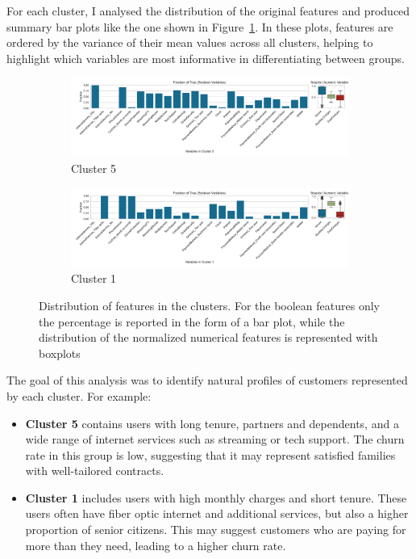 \documentclass[a4paper,11pt]{article}
\begin{document}
For each cluster, I analysed the distribution of the original features and produced summary bar plots like the one shown in Figure~\ref{fig:cluster_5}. In these plots, features are ordered by the variance of their mean values across all clusters, helping to highlight which variables are most informative in differentiating between groups.
\begin{figure}[h]
\centering
\begin{subfigure}{\linewidth}
    \includegraphics[width=\linewidth]{figures/clustering/cluster_5_clusters.pdf}
\caption{Cluster 5}
\label{fig:cluster_5}
\end{subfigure}
\begin{subfigure}{\linewidth}
    \includegraphics[width=\linewidth]{figures/clustering/cluster_1_clusters.pdf}
\caption{Cluster 1}
\label{fig:cluster_1}
\end{subfigure}
\caption{Distribution of features in the clusters. For the boolean features only the percentage is reported in the form of a bar plot, while the distribution of the normalized numerical features is represented with boxplots}
\end{figure}
The goal of this analysis was to identify natural profiles of customers represented by each cluster. For example:
\begin{itemize}
\item \textbf{Cluster 5} contains users with long tenure, partners and dependents, and a wide range of internet services such as streaming or tech support. The churn rate in this group is low, suggesting that it may represent satisfied families with well-tailored contracts.
\item \textbf{Cluster 1} includes users with high monthly charges and short tenure. These users often have fiber optic internet and additional services, but also a higher proportion of senior citizens. This may suggest customers who are paying for more than they need, leading to a higher churn rate.
\end{itemize}
\end{document}
